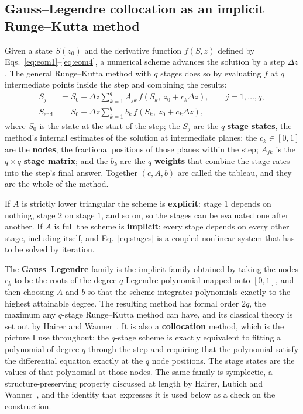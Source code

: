 \documentclass[11pt,a4paper]{article}
\begin{document}
\subsection{Gauss--Legendre collocation as an implicit Runge--Kutta method}
\label{sec:theory-collocation}

Given a state $S(z_0)$ and the derivative function $f(S, z)$ defined by
Eqs.~\eqref{eq:eom1}--\eqref{eq:eom4}, a numerical scheme advances the solution
by a step $\Delta z$. The general Runge--Kutta method with $q$ stages does so
by evaluating $f$ at $q$ intermediate points inside the step and combining the
results:
%
\begin{align}
  S_j &= S_0 + \Delta z \sum_{k=1}^{q} A_{jk}\,
         f\!\left(S_k,\ z_0 + c_k \Delta z\right), \qquad j = 1,\dots,q,
  \label{eq:stages}\\
  S_{\mathrm{end}} &= S_0 + \Delta z \sum_{k=1}^{q} b_k\,
         f\!\left(S_k,\ z_0 + c_k \Delta z\right),
  \label{eq:endpoint}
\end{align}
%
where $S_0$ is the state at the start of the step; the $S_j$ are the $q$
\textbf{stage states}, the method's internal estimates of the solution at
intermediate planes; the $c_k \in [0,1]$ are the \textbf{nodes}, the fractional
positions of those planes within the step; $A_{jk}$ is the $q \times q$
\textbf{stage matrix}; and the $b_k$ are the $q$ \textbf{weights} that combine
the stage rates into the step's final answer. Together $(c, A, b)$ are called
the tableau, and they are the whole of the method.

If $A$ is strictly lower triangular the scheme is \textbf{explicit}: stage $1$
depends on nothing, stage $2$ on stage $1$, and so on, so the stages can be
evaluated one after another. If $A$ is full the scheme is \textbf{implicit}:
every stage depends on every other stage, including itself, and
Eq.~\eqref{eq:stages} is a coupled nonlinear system that has to be solved by
iteration.

The \textbf{Gauss--Legendre} family is the implicit family obtained by taking
the nodes $c_k$ to be the roots of the degree-$q$ Legendre polynomial mapped
onto $[0,1]$, and then choosing $A$ and $b$ so that the scheme integrates
polynomials exactly to the highest attainable degree. The resulting method has
formal order $2q$, the maximum any $q$-stage Runge--Kutta method can have, and
its classical theory is set out by Hairer and Wanner~\citep{hairer1996}. It is
also a \textbf{collocation} method, which is the picture I use throughout: the
$q$-stage scheme is exactly equivalent to fitting a polynomial of degree $q$
through the step and requiring that the polynomial satisfy the differential
equation exactly at the $q$ node positions. The stage states are the values of
that polynomial at those nodes. The same family is symplectic, a
structure-preserving property discussed at length by Hairer, Lubich and
Wanner~\citep{hairer2006}, and the identity that expresses it is used below as
a check on the construction.
\end{document}
